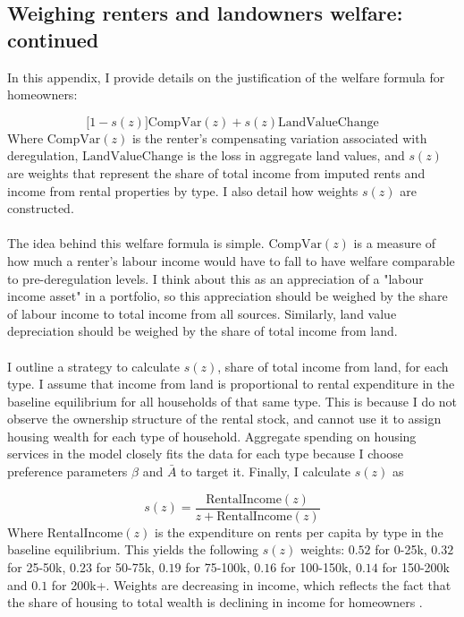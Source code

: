 \documentclass[12pt]{article}
\begin{document}
	
	\clearpage
	\subsection{Weighing renters and landowners welfare: continued}\label{Appendix:RenterLandownerWelfare}
	In this appendix, I provide details on the justification of the welfare formula for homeowners:
	
	\begin{equation*}
		\big[1 - s(z)\big]\text{CompVar}(z) +  s(z)\text{LandValueChange}
	\end{equation*}
	Where $\text{CompVar}(z)$ is the renter's compensating variation associated with deregulation, $\text{LandValueChange}$ is the loss in aggregate land values, and $s(z)$ are weights that represent the share of total income from imputed rents and income from rental properties by type. I also detail how weights $s(z)$ are constructed.
	
	\paragraph*{}
	The idea behind this welfare formula is simple. $\text{CompVar}(z)$ is a measure of how much a renter's labour income would have to fall to have welfare comparable to pre-deregulation levels. I think about this as an appreciation of a "labour income asset" in a portfolio, so this appreciation should be weighed by the share of labour income to total income from all sources. Similarly, land value depreciation should be weighed by the share of total income from land.
	
	\paragraph*{}
	I outline a strategy to calculate $s(z)$, share of total income from land, for each type. I assume that income from land is proportional to rental expenditure in the baseline equilibrium for all households of that same type. This is because I do not observe the ownership structure of the rental stock, and cannot use it to assign housing wealth for each type of household. Aggregate spending on housing services in the model closely fits the data for each type because I choose preference parameters $\beta$ and $\bar{A}$ to target it. Finally, I calculate $s(z)$ as 
	
	\begin{equation*}
		s(z) = \frac{\text{RentalIncome}(z)}{z + \text{RentalIncome}(z)}
	\end{equation*}
	Where $\text{RentalIncome}(z)$ is the expenditure on rents per capita by type in the baseline equilibrium. This yields the following $s(z)$ weights: $0.52$ for 0-25k, $0.32$ for 25-50k, $0.23$ for 50-75k, $0.19$ for 75-100k, $0.16$ for 100-150k, $0.14$ for 150-200k and $0.1$ for 200k+. Weights are decreasing in income, which reflects the fact that the share of housing to total wealth is declining in income for homeowners \citep{Greaney}.
	
\end{document}
